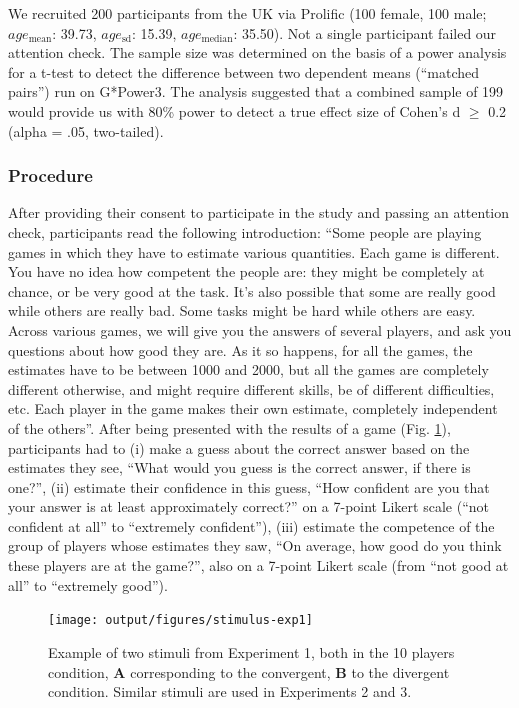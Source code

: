 \documentclass[
  doc,floatsintext]{apa6}
\begin{document}
We recruited 200 participants from the UK via Prolific (100 female, 100 male; \(age_\text{mean}\): 39.73, \(age_\text{sd}\): 15.39, \(age_\text{median}\): 35.50). Not a single participant failed our attention check. The sample size was determined on the basis of a power analysis for a t-test to detect the difference between two dependent means (``matched pairs'') run on G*Power3. The analysis suggested that a combined sample of 199 would provide us with 80\% power to detect a true effect size of Cohen's d \(\geq\) 0.2 (alpha = .05, two-tailed).

\subsubsection{Procedure}\label{procedure}

After providing their consent to participate in the study and passing an attention check, participants read the following introduction: ``Some people are playing games in which they have to estimate various quantities. Each game is different. You have no idea how competent the people are: they might be completely at chance, or be very good at the task. It's also possible that some are really good while others are really bad. Some tasks might be hard while others are easy. Across various games, we will give you the answers of several players, and ask you questions about how good they are. As it so happens, for all the games, the estimates have to be between 1000 and 2000, but all the games are completely different otherwise, and might require different skills, be of different difficulties, etc. Each player in the game makes their own estimate, completely independent of the others''. After being presented with the results of a game (Fig. \ref{fig:stimulus-exp1}), participants had to (i) make a guess about the correct answer based on the estimates they see, ``What would you guess is the correct answer, if there is one?'', (ii) estimate their confidence in this guess, ``How confident are you that your answer is at least approximately correct?'' on a 7-point Likert scale (``not confident at all'' to ``extremely confident''), (iii) estimate the competence of the group of players whose estimates they saw, ``On average, how good do you think these players are at the game?'', also on a 7-point Likert scale (from ``not good at all'' to ``extremely good'').



\begin{figure}

\texttt{[image: output/figures/stimulus-exp1]} \hfill{}

\caption{Example of two stimuli from Experiment 1, both in the 10 players condition, \textbf{A} corresponding to the convergent, \textbf{B} to the divergent condition. Similar stimuli are used in Experiments 2 and 3.}\label{fig:stimulus-exp1}
\end{figure}
\end{document}
